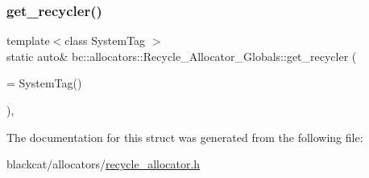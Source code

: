 \subsubsection{\texorpdfstring{get\+\_\+recycler()}{get\_recycler()}}
{\footnotesize\ttfamily template$<$class System\+Tag $>$ \\
static auto\& bc\+::allocators\+::\+Recycle\+\_\+\+Allocator\+\_\+\+Globals\+::get\+\_\+recycler (\begin{DoxyParamCaption}\item[{System\+Tag}]{ = {\ttfamily SystemTag()} }\end{DoxyParamCaption})\hspace{0.3cm}{\ttfamily [inline]}, {\ttfamily [static]}}



The documentation for this struct was generated from the following file\+:\begin{DoxyCompactItemize}
\item 
blackcat/allocators/\hyperlink{recycle__allocator_8h}{recycle\+\_\+allocator.\+h}\end{DoxyCompactItemize}
